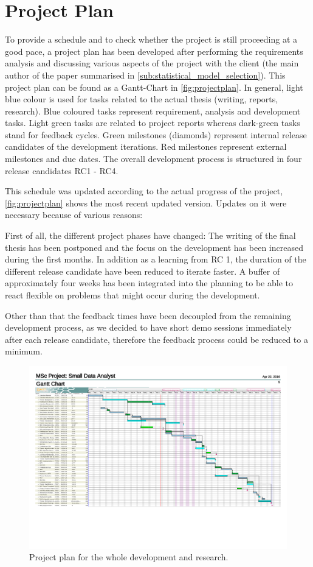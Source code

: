 \section{Project Plan}
\label{sec:projectplan}
To provide a schedule and to check whether the project is still proceeding at a good pace, a project plan has been developed after performing the requirements analysis and discussing various aspects of the project with the client (the main author of the paper summarised in \autoref{sub:statistical_model_selection}). This project plan can be found as a Gantt-Chart in \autoref{fig:projectplan}. In general, light blue colour is used for tasks related to the actual thesis (writing, reports, research). Blue coloured tasks represent requirement, analysis and development tasks. Light green tasks are related to project reports whereas dark-green tasks stand for feedback cycles. Green milestones (diamonds) represent internal release candidates of the development iterations. Red milestones represent external milestones and due dates. The overall development process is structured in four release candidates RC1 - RC4. 

This schedule was updated according to the actual progress of the project, \autoref{fig:projectplan} shows the most recent updated version. Updates on it were necessary because of various reasons:

First of all, the different project phases have changed: The writing of the final thesis has been postponed and the focus on the development has been increased during the first months. In addition as a learning from RC 1, the duration of the different release candidate have been reduced to iterate faster. A buffer of approximately four weeks has been integrated into the planning to be able to react flexible on problems that might occur during the development. 

Other than that the feedback times have been decoupled from the remaining development process, as we decided to have short demo sessions immediately after each release candidate, therefore the feedback process could be reduced to a minimum.

\begin{figure}
	\centering
	\includegraphics[width=\textwidth]{appendix/Projectplan}
	\caption{Project plan for the whole development and research.}
	\label{fig:projectplan}
\end{figure}
\restoregeometry